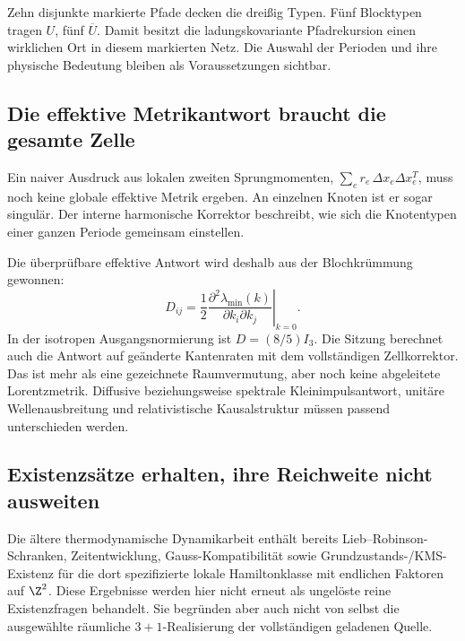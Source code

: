 Zehn disjunkte markierte Pfade decken die dreißig Typen. Fünf Blocktypen tragen $U$, fünf $\overline U$. Damit besitzt die ladungskovariante Pfadrekursion einen wirklichen Ort in diesem markierten Netz. Die Auswahl der Perioden und ihre physische Bedeutung bleiben als Voraussetzungen sichtbar.

\subsection{Die effektive Metrikantwort braucht die gesamte Zelle}
Ein naiver Ausdruck aus lokalen zweiten Sprungmomenten,
$\sum_e r_e\,\Delta x_e\Delta x_e^T$, muss noch keine globale effektive Metrik ergeben. An einzelnen Knoten ist er sogar singulär. Der interne harmonische Korrektor beschreibt, wie sich die Knotentypen einer ganzen Periode gemeinsam einstellen.

Die überprüfbare effektive Antwort wird deshalb aus der Blochkrümmung gewonnen:
\begin{equation}
D_{ij}=\frac12\left.\frac{\partial^2\lambda_{\min}(k)}{\partial k_i\partial k_j}\right|_{k=0}.
\end{equation}
In der isotropen Ausgangsnormierung ist $D=(8/5)I_3$. Die Sitzung berechnet auch die Antwort auf geänderte Kantenraten mit dem vollständigen Zellkorrektor. Das ist mehr als eine gezeichnete Raumvermutung, aber noch keine abgeleitete Lorentzmetrik. Diffusive beziehungsweise spektrale Kleinimpulsantwort, unitäre Wellenausbreitung und relativistische Kausalstruktur müssen passend unterschieden werden.


\subsection{Existenzsätze erhalten, ihre Reichweite nicht ausweiten}
Die ältere thermodynamische Dynamikarbeit enthält bereits Lieb--Robinson-Schranken, Zeitentwicklung, Gauss-Kompatibilität sowie Grundzustands-/KMS-Existenz für die dort spezifizierte lokale Hamiltonklasse mit endlichen Faktoren auf $\Z^2$. Diese Ergebnisse werden hier nicht erneut als ungelöste reine Existenzfragen behandelt. Sie begründen aber auch nicht von selbst die ausgewählte räumliche $3+1$-Realisierung der vollständigen geladenen Quelle.

